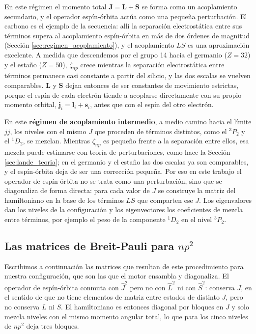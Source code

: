 En este régimen el momento total $\mathbf{J} = \mathbf{L} + \mathbf{S}$ se forma como un acoplamiento secundario, y el operador espín-órbita actúa como una pequeña perturbación. El carbono es el ejemplo de la secuencia: allí la separación electrostática entre sus términos supera al acoplamiento espín-órbita en más de dos órdenes de magnitud (Sección \ref{sec:regimen_acoplamiento}), y el acoplamiento $LS$ es una aproximación excelente. A medida que descendemos por el grupo 14 hacia el germanio ($Z=32$) y el estaño ($Z=50$), $\zeta_{np}$ crece mientras la separación electrostática entre términos permanece casi constante a partir del silicio, y las dos escalas se vuelven comparables. $\mathbf{L}$ y $\mathbf{S}$ dejan entonces de ser constantes de movimiento estrictas, porque el espín de cada electrón tiende a acoplarse directamente con su propio momento orbital, $\mathbf{j}_i = \mathbf{l}_i + \mathbf{s}_i$, antes que con el espín del otro electrón.

En este \textbf{régimen de acoplamiento intermedio}, a medio camino hacia el límite $jj$, los niveles con el mismo $J$ que proceden de términos distintos, como el $^3P_2$ y el $^1D_2$, se mezclan. Mientras $\zeta_{np}$ es pequeño frente a la separación entre ellos, esa mezcla puede estimarse con teoría de perturbaciones, como hace la Sección \ref{sec:lande_teoria}; en el germanio y el estaño las dos escalas ya son comparables, y el espín-órbita deja de ser una corrección pequeña. Por eso en este trabajo el operador de espín-órbita no se trata como una perturbación, sino que se diagonaliza de forma directa: para cada valor de $J$ se construye la matriz del hamiltoniano en la base de los términos $LS$ que comparten ese $J$. Los eigenvalores dan los niveles de la configuración y los eigenvectores los coeficientes de mezcla entre términos, por ejemplo el peso de la componente $^1D_2$ en el nivel $^3P_2$.


\subsection{Las matrices de Breit-Pauli para $np^2$}
\label{sec:matrices_bp}

Escribimos a continuación las matrices que resultan de este procedimiento para nuestra configuración, que son las que el motor ensambla y diagonaliza. El operador de espín-órbita conmuta con $\hat{J}^2$ pero no con $\hat{L}^2$ ni con $\hat{S}^2$: conserva $J$, en el sentido de que no tiene elementos de matriz entre estados de distinto $J$, pero no conserva $L$ ni $S$. El hamiltoniano es entonces diagonal por bloques en $J$ y solo mezcla niveles con el mismo momento angular total, lo que para los cinco niveles de $np^2$ deja tres bloques.


